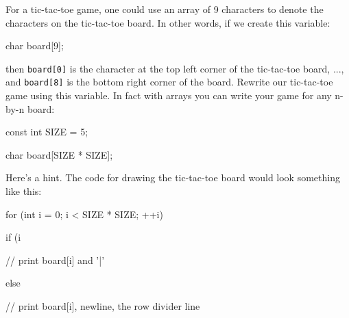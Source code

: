 For a tic-tac-toe game, one could use an array of 9 characters to denote the characters on the tic-tac-toe board. In other words, if we create this variable:



\begin{consolethree}[escapeinside=||]

char board[9];

\end{consolethree}



then \texttt{board[0]} is the character at the top left corner of the tic-tac-toe board, ..., and \texttt{board[8]} is the bottom right corner of the board. Rewrite our tic-tac-toe game using this variable. In fact with arrays you can write your game for any n-by-n board:



\begin{consolethree}[escapeinside=||]

const int SIZE = 5;

char board[SIZE * SIZE];

\end{consolethree}



Here's a hint. The code for drawing the tic-tac-toe board would look something like this:



\begin{consolethree}

for (int i = 0; i < SIZE * SIZE; ++i)

{

    if (i %

    {

        // print board[i] and '|'

    }

    else

    {

        // print board[i], newline, the row divider line

    }

}

\end{consolethree}

